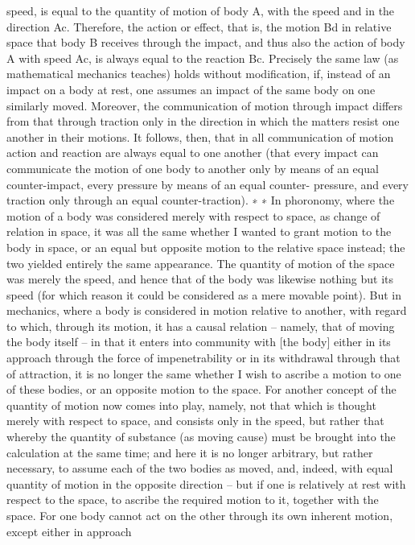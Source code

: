 speed, is equal to the quantity of motion of body A, with the speed and
in the direction Ac. Therefore, the action or effect, that is, the motion
Bd in relative space that body B receives through the impact, and thus
also the action of body A with speed Ac, is always equal to the reaction
Bc. Precisely the same law (as mathematical mechanics teaches) holds
without modiﬁcation, if, instead of an impact on a body at rest, one
assumes an impact of the same body on one similarly moved. Moreover,
the communication of motion through impact differs from that through
traction only in the direction in which the matters resist one another
in their motions. It follows, then, that in all communication of motion
action and reaction are always equal to one another (that every impact
can communicate the motion of one body to another only by means of
an equal counter-impact, every pressure by means of an equal counter-
pressure, and every traction only through an equal counter-traction). ∗
∗
In phoronomy, where the motion of a body was considered merely with respect
to space, as change of relation in space, it was all the same whether I wanted
to grant motion to the body in space, or an equal but opposite motion to
the relative space instead; the two yielded entirely the same appearance. The
quantity of motion of the space was merely the speed, and hence that of the
body was likewise nothing but its speed (for which reason it could be considered
as a mere movable point). But in mechanics, where a body is considered in
motion relative to another, with regard to which, through its motion, it has
a causal relation – namely, that of moving the body itself – in that it enters
into community with [the body] either in its approach through the force of
impenetrability or in its withdrawal through that of attraction, it is no longer
the same whether I wish to ascribe a motion to one of these bodies, or an
opposite motion to the space. For another concept of the quantity of motion
now comes into play, namely, not that which is thought merely with respect to
space, and consists only in the speed, but rather that whereby the quantity of
substance (as moving cause) must be brought into the calculation at the same
time; and here it is no longer arbitrary, but rather necessary, to assume each of
the two bodies as moved, and, indeed, with equal quantity of motion in the
opposite direction – but if one is relatively at rest with respect to the space, to
ascribe the required motion to it, together with the space. For one body cannot
act on the other through its own inherent motion, except either in approach
